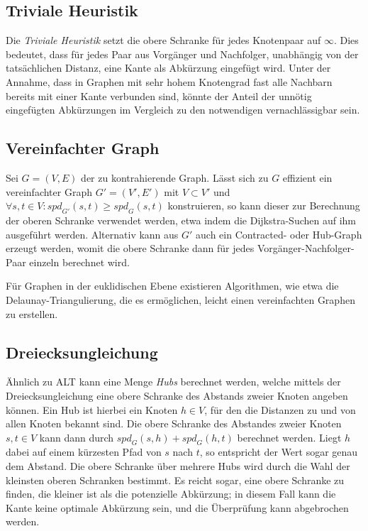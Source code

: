 \subsection{Triviale Heuristik}

Die \emph{Triviale Heuristik} setzt die obere Schranke für jedes Knotenpaar auf $\infty$.
Dies bedeutet, dass für jedes Paar aus Vorgänger und Nachfolger, unabhängig von der tatsächlichen Distanz, eine Kante als Abkürzung eingefügt wird.
Unter der Annahme, dass in Graphen mit sehr hohem Knotengrad fast alle Nachbarn bereits mit einer Kante verbunden sind, könnte der Anteil der unnötig eingefügten Abkürzungen im Vergleich zu den notwendigen vernachlässigbar sein.

\subsection{Vereinfachter Graph}

Sei $G = (V, E)$ der zu kontrahierende Graph.
Lässt sich zu $G$ effizient ein vereinfachter Graph $G' = (V', E')$ mit $V \subset V'$ und $\forall s, t \in V \colon {spd}_{G'} (s, t) \geq {spd}_{G} (s, t)$ konstruieren, so kann dieser zur Berechnung der oberen Schranke verwendet werden, etwa indem die Dijkstra-Suchen auf ihm ausgeführt werden.
Alternativ kann aus $G'$ auch ein Contracted- oder Hub-Graph erzeugt werden, womit die obere Schranke dann für jedes Vorgänger-Nachfolger-Paar einzeln berechnet wird.

Für Graphen in der euklidischen Ebene existieren Algorithmen, wie etwa die Delaunay-Triangulierung, die es ermöglichen, leicht einen vereinfachten Graphen zu erstellen.

\subsection{Dreiecksungleichung}

Ähnlich zu ALT\cite{goldberg2005computing} kann eine Menge \emph{Hubs} berechnet werden, welche mittels der Dreiecksungleichung eine obere Schranke des Abstands zweier Knoten angeben können.
Ein Hub ist hierbei ein Knoten $h \in V$, für den die Distanzen zu und von allen Knoten bekannt sind.
Die obere Schranke des Abstandes zweier Knoten $s, t \in V$ kann dann durch ${spd}_G (s, h) + {spd}_G (h, t)$ berechnet werden.
Liegt $h$ dabei auf einem kürzesten Pfad von $s$ nach $t$, so entspricht der Wert sogar genau dem Abstand.
Die obere Schranke über mehrere Hubs wird durch die Wahl der kleinsten oberen Schranken bestimmt.
Es reicht sogar, eine obere Schranke zu finden, die kleiner ist als die potenzielle Abkürzung; in diesem Fall kann die Kante keine optimale Abkürzung sein, und die Überprüfung kann abgebrochen werden.

